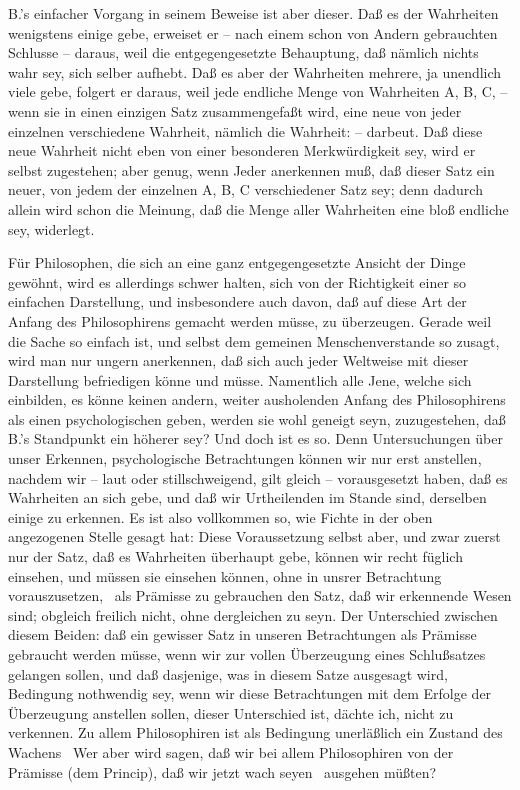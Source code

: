 B.'s einfacher Vorgang in seinem Beweise ist aber dieser. Daß es der Wahrheiten wenigstens einige gebe, erweiset er -- nach einem schon von Andern gebrauchten Schlusse -- daraus, weil die entgegengesetzte Behauptung, daß nämlich nichts wahr sey, sich selber aufhebt. Daß es aber der Wahrheiten mehrere, ja unendlich viele gebe, folgert er daraus, weil jede endliche Menge von Wahrheiten A, B, C, -- wenn sie in einen einzigen Satz zusammengefaßt wird, eine neue von jeder einzelnen verschiedene Wahrheit, nämlich die Wahrheit:  -- darbeut. Daß diese neue Wahrheit nicht eben von einer besonderen Merkwürdigkeit sey, wird er selbst zugestehen; aber genug, wenn Jeder anerkennen muß, daß dieser Satz ein neuer, von jedem der einzelnen A, B, C verschiedener Satz sey; denn dadurch allein wird schon die Meinung, daß die Menge aller Wahrheiten eine bloß endliche sey, widerlegt. \par
Für Philosophen, die sich an eine ganz entgegengesetzte Ansicht der Dinge gewöhnt, wird es allerdings schwer halten, sich von der Richtigkeit einer so einfachen Darstellung, und insbesondere auch davon, daß auf diese Art der Anfang des Philosophirens gemacht werden müsse, zu überzeugen. Gerade weil die Sache so einfach ist, und selbst dem gemeinen Menschenverstande so zusagt, wird man nur ungern anerkennen, daß sich auch jeder Weltweise mit dieser Darstellung befriedigen könne und müsse. Namentlich alle Jene, welche sich einbilden, es könne keinen andern, weiter ausholenden Anfang des Philosophirens als einen psychologischen geben, werden sie wohl geneigt seyn, zuzugestehen, daß B.'s Standpunkt ein höherer sey? Und doch ist es so. Denn  Untersuchungen über unser Erkennen, psychologische Betrachtungen können wir nur erst anstellen, nachdem wir -- laut oder stillschweigend, gilt gleich -- vorausgesetzt haben, daß es Wahrheiten an sich gebe, und daß wir Urtheilenden im Stande sind, derselben einige zu erkennen. Es ist also vollkommen so, wie Fichte in der oben angezogenen Stelle gesagt hat:  Diese Voraussetzung selbst aber, und zwar zuerst nur der Satz, daß es Wahrheiten überhaupt gebe, können wir recht füglich einsehen, und müssen sie einsehen können, ohne in unsrer Betrachtung vorauszusetzen, \dh\  als Prämisse zu gebrauchen den Satz, daß wir erkennende Wesen sind; obgleich freilich nicht, ohne dergleichen zu seyn. Der Unterschied zwischen diesem Beiden: daß ein gewisser Satz in unseren Betrachtungen als Prämisse gebraucht werden müsse, wenn wir zur vollen Überzeugung eines Schlußsatzes gelangen sollen, und daß dasjenige, was in diesem Satze ausgesagt wird,  Bedingung nothwendig sey, wenn wir diese Betrachtungen mit dem Erfolge der Überzeugung anstellen sollen, dieser Unterschied ist, dächte ich, nicht zu verkennen. Zu allem Philosophiren ist als Bedingung unerläßlich ein Zustand des Wachens \umA\ Wer aber wird sagen, daß wir bei allem Philosophiren von der Prämisse (dem Princip), daß wir jetzt wach seyen \usw\ ausgehen müßten? \par
